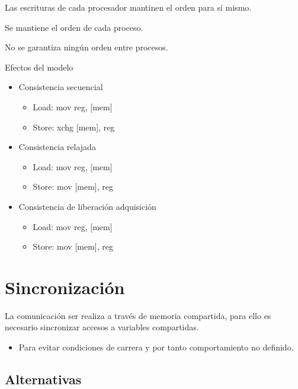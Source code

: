 \documentclass[12pt, twoside, openright]{report} %
\begin{document}
    Las escrituras de cada procesador mantinen el orden para sí mismo.

    Se mantiene el orden de cada proceso.

    No se garantiza ningún orden entre procesos.

    Efectos del modelo
\begin{itemize}
  \item Consistencia secuencial 

  \begin{itemize}
  \item Load: mov reg, {[}mem{]}
  \item
    Store: xchg {[}mem{]}, reg
  \end{itemize}
  \pagebreak
  \item
    Consistencia relajada
    \begin{itemize}
  \item
    Load: mov reg, {[}mem{]}

    \item
      Store: mov {[}mem{]}, reg

    \end{itemize}

    \item Consistencia de liberación adquisición 

  \begin{itemize}
  \item Load: mov reg, {[}mem{]}
  \item
    Store: mov {[}mem{]}, reg
  \end{itemize}
\end{itemize}
    

    
\section{Sincronización}


  La comunicación ser realiza a través de memoria compartida, para
  ello es necesario sincronizar accesos a variables compartidas.

  \begin{itemize}
  
  \item
    Para evitar condiciones de carrera y por tanto comportamiento no
    definido.
  \end{itemize}

  \subsection{Alternativas}
\end{document}
